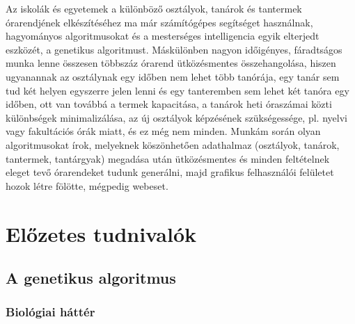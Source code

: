 \documentclass[12pt,a4paper]{report}
\begin{document}
\newpage

\pagestyle{fancy}


Az iskolák és egyetemek a különböző osztályok, tanárok és tantermek órarendjének 
elkészítéséhez ma már számítógépes segítséget használnak, hagyományos algoritmusokat és a
mesterséges intelligencia egyik elterjedt eszközét, a genetikus algoritmust. Máskülönben 
nagyon időigényes, fáradtságos munka lenne összesen többszáz órarend ütközésmentes 
összehangolása, hiszen ugyanannak az osztálynak egy időben nem lehet több tanórája, egy tanár
sem tud két helyen egyszerre jelen lenni és egy tanteremben sem lehet két tanóra egy időben,
ott van továbbá a termek kapacitása, a tanárok heti óraszámai közti különbségek 
minimalizálása, az új osztályok képzésének szükségessége, pl. nyelvi vagy fakultációs órák 
miatt, és ez még nem minden. Munkám során olyan algoritmusokat írok, melyeknek köszönhetően 
adathalmaz (osztályok, tanárok, tantermek, tantárgyak) megadása után ütközésmentes és minden
feltételnek eleget tevő órarendeket tudunk generálni, majd grafikus felhasználói felületet 
hozok létre fölötte, mégpedig webeset.

\newpage

\chapter{Előzetes tudnivalók}

\section{A genetikus algoritmus}

\subsection{Biológiai háttér}
\end{document}
